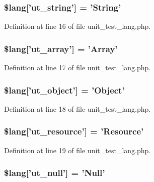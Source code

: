 \subsubsection[{\$lang}]{\setlength{\rightskip}{0pt plus 5cm}\$lang['ut\-\_\-string'] = 'String'}\label{unit__test__lang_8php_ab5097b676a29051de6c07955d59659d1}


Definition at line 16 of file unit\-\_\-test\-\_\-lang.\-php.

\subsubsection[{\$lang}]{\setlength{\rightskip}{0pt plus 5cm}\$lang['ut\-\_\-array'] = 'Array'}\label{unit__test__lang_8php_a3d6aa3d4ed503f15adc21813a9018950}


Definition at line 17 of file unit\-\_\-test\-\_\-lang.\-php.

\subsubsection[{\$lang}]{\setlength{\rightskip}{0pt plus 5cm}\$lang['ut\-\_\-object'] = 'Object'}\label{unit__test__lang_8php_a771c29e5029c601b1f3e7c4e6fb93c94}


Definition at line 18 of file unit\-\_\-test\-\_\-lang.\-php.

\subsubsection[{\$lang}]{\setlength{\rightskip}{0pt plus 5cm}\$lang['ut\-\_\-resource'] = 'Resource'}\label{unit__test__lang_8php_a6653a67c4fc0bc5ade6aaf327eed05bf}


Definition at line 19 of file unit\-\_\-test\-\_\-lang.\-php.

\subsubsection[{\$lang}]{\setlength{\rightskip}{0pt plus 5cm}\$lang['ut\-\_\-null'] = 'Null'}\label{unit__test__lang_8php_ad4aef71cf1e43fa884add4613da590cb}


